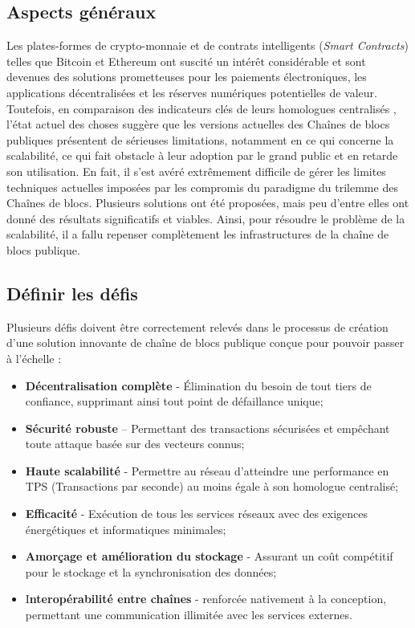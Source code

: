 \documentclass[journal]{IEEEtran}
\begin{document}
\subsection{Aspects généraux}
Les plates-formes de crypto-monnaie et de contrats intelligents (\textit{Smart Contracts}) telles que Bitcoin et Ethereum ont suscité un intérêt considérable et sont devenues des solutions prometteuses pour les paiements électroniques, les applications décentralisées et les réserves numériques potentielles de valeur. Toutefois, en comparaison des indicateurs clés de leurs homologues centralisés \cite{1}, l'état actuel des choses suggère que les versions actuelles des Chaînes de blocs publiques présentent de sérieuses limitations, notamment en ce qui concerne la scalabilité, ce qui fait obstacle à leur adoption par le grand public et en retarde son utilisation. En fait, il s'est avéré extrêmement difficile de gérer les limites techniques actuelles imposées par les compromis du paradigme du trilemme des Chaînes de blocs\cite{2}. Plusieurs solutions ont été proposées, mais peu d'entre elles ont donné des résultats significatifs et viables. Ainsi, pour résoudre le problème de la scalabilité, il a fallu repenser complètement les infrastructures de la chaîne  de blocs publique.

\subsection{Définir les défis}
Plusieurs défis doivent être correctement relevés dans le processus de création d'une solution innovante de chaîne  de blocs  publique conçue pour pouvoir passer à l'échelle :
\begin{itemize}
  \item \textbf{Décentralisation complète} - Élimination du besoin de tout tiers de confiance, supprimant ainsi tout point de défaillance unique;
  \item \textbf{Sécurité robuste} – Permettant des transactions sécurisées et empêchant toute attaque basée sur des vecteurs connus;
  \item \textbf{Haute scalabilité} - Permettre au réseau d'atteindre une performance en TPS (Transactions par seconde) au moins égale à son homologue centralisé;
   \item \textbf{Efficacité} - Exécution de tous les services réseaux avec des exigences énergétiques et informatiques minimales;   
   \item \textbf{Amorçage et amélioration du stockage} - Assurant un coût compétitif pour le stockage et la synchronisation des données;
   \item I\textbf{nteropérabilité entre chaînes }- renforcée nativement à la conception, permettant une communication illimitée avec les services externes.
\end{itemize}
\end{document}
